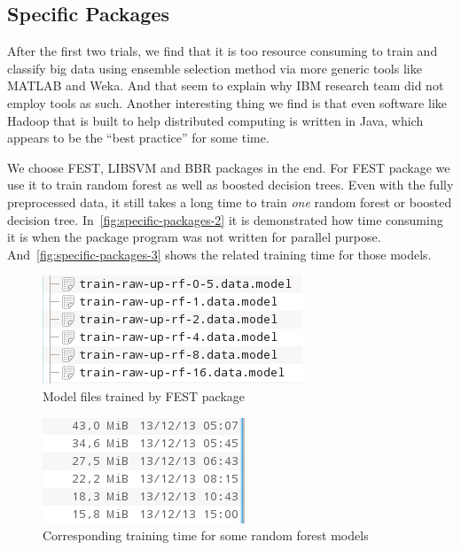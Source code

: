 \documentclass[journal]{IEEEtran}
\begin{document}
 


\subsection{Specific Packages}
\label{sec:specific-packages}
After the first two trials, we find that it is too resource consuming
to train and classify big data using ensemble selection method via
more generic tools like MATLAB and Weka. And that seem to explain why
IBM research team did not employ tools as such. Another interesting
thing we find is that even software like Hadoop that is built to help
distributed computing is written in Java, which appears to be the
``best practice'' for some time.
\par
We choose FEST, LIBSVM and BBR packages in the end. For FEST package
we use it to train random forest as well as boosted decision
trees. Even with the fully preprocessed data, it still takes a long
time to train \emph{one} random forest or boosted decision
tree. In~\autoref{fig:specific-packages-2} it is demonstrated how time
consuming it is when the package program was not written for parallel
purpose. And~\autoref{fig:specific-packages-3} shows the related
training time for those models. 
\begin{figure}[!t]
  \centering
  \includegraphics{Age-of-Big-Data6}
  \caption{Model files trained by FEST package}
  \label{fig:specific-packages-2}
\end{figure}

\begin{figure}[!t]
  \centering
  \includegraphics{Age-of-Big-Data5}
  \caption{Corresponding training time for some random forest models}
  \label{fig:specific-packages-3}
\end{figure}
\end{document}
